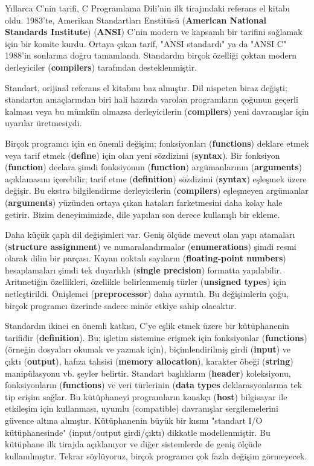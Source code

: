 \documentclass[a4paper,12pt,oneside]{book}
\begin{document}
\thispagestyle{introduction} \par Yıllarca C'nin tarifi, C Programlama Dili'nin ilk tirajındaki referans el kitabı oldu. 1983'te, Amerikan Standartları Enstitüsü (\textbf{American National Standards Institute}) (\textbf{ANSI}) C'nin modern ve kapsamlı bir tarifini sağlamak için bir komite kurdu. Ortaya çıkan tarif, "ANSI standardı" ya da "ANSI C" 1988'in sonlarına doğru tamamlandı. Standardın birçok özelliği çoktan modern derleyiciler (\textbf{compilers}) tarafından desteklenmiştir.
\par Standart, orijinal referans el kitabını baz almıştır. Dil nispeten biraz değişti; standartın amaçlarından biri hali hazırda varolan programların çoğunun geçerli kalması veya bu mümkün olmazsa derleyicilerin (\textbf{compilers}) yeni davranışlar için uyarılar üretmesiydi.
\par Birçok programcı için en önemli değişim; fonksiyonları (\textbf{functions}) deklare etmek veya tarif etmek (\textbf{define}) için olan yeni sözdizimi (\textbf{syntax}). Bir fonksiyon (\textbf{function}) declara şimdi fonksiyonun (\textbf{function}) argümanlarının (\textbf{arguments}) açıklamasını içerebilir; tarif etme (\textbf{definition}) sözdizimi (\textbf{syntax}) eşleşmek üzere değişir. Bu ekstra bilgilendirme derleyicilerin (\textbf{compilers}) eşleşmeyen argümanlar (\textbf{arguments}) yüzünden ortaya çıkan hataları farketmesini daha kolay hale getirir. Bizim deneyimimizde, dile yapılan son derece kullanışlı bir ekleme.
\par Daha küçük çaplı dil değişimleri var. Geniş ölçüde mevcut olan yapı atamaları (\textbf{structure assignment}) ve numaralandırmalar (\textbf{enumerations}) şimdi resmi olarak dilin bir parçası. Kayan noktalı sayıların (\textbf{floating-point numbers}) hesaplamaları şimdi tek duyarlıklı (\textbf{single precision}) formatta yapılabilir. Aritmetiğin özellikleri, özellikle belirlenmemiş türler (\textbf{unsigned types}) için netleştirildi. Önişlemci (\textbf{preprocessor}) daha ayrıntılı. Bu değişimlerin çoğu, birçok programcı üzerinde sadece minör etkiye sahip olacaktır.
\par Standardın ikinci en önemli katkısı, C'ye eşlik etmek üzere bir kütüphanenin tarifidir (\textbf{definition}). Bu; işletim sistemine erişmek için fonksiyonlar (\textbf{functions}) (örneğin dosyaları okumak ve yazmak için), biçimlendirilmiş girdi (\textbf{input}) ve çıktı (\textbf{output}), hafıza tahsisi (\textbf{memory allocation}), karakter öbeği (\textbf{string}) manipülasyonu vb. şeyler belirtir. Standart başlıkların (\textbf{header}) koleksiyonu, fonksiyonların (\textbf{functions}) ve veri türlerinin (\textbf{data types} deklarasyonlarına tek tip erişim sağlar. Bu kütüphaneyi programların konakçı (\textbf{host}) bilgisayar ile etkileşim için kullanması, uyumlu (compatible) davranışlar sergilemelerini güvence altına almıştır. Kütüphanenin büyük bir kısmı "standart I/O kütüphanesinde" (input/output girdi/çıktı) dikkatle modellenmiştir. Bu kütüphane ilk tirajda açıklanıyor ve diğer sistemlerde de geniş ölçüde kullanılmıştır. Tekrar söylüyoruz, birçok programcı çok fazla değişim görmeyecek.
\end{document}
